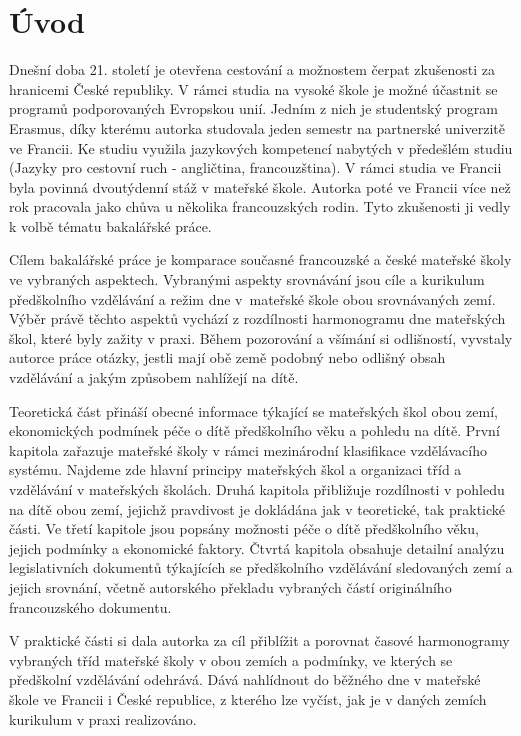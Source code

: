 \setcounter{page}{1}
\chapter*{Úvod}
Dnešní doba 21. století je otevřena cestování a možnostem čerpat zkušenosti za hranicemi České republiky. V rámci studia na vysoké škole je možné účastnit se programů podporovaných Evropskou unií. Jedním z nich je studentský program Erasmus, díky kterému autorka studovala jeden semestr na partnerské univerzitě ve Francii. Ke studiu využila jazykových kompetencí nabytých v předešlém studiu (Jazyky pro cestovní ruch - angličtina, francouzština). V rámci studia ve Francii byla povinná dvoutýdenní stáž v mateřské škole. Autorka poté ve Francii více než rok pracovala jako chůva u několika francouzských rodin. Tyto zkušenosti ji vedly k volbě tématu bakalářské práce. 

Cílem bakalářské práce je komparace současné francouzské a české mateřské školy ve vybraných aspektech. Vybranými aspekty srovnávání jsou cíle a kurikulum předškolního vzdělávání a režim dne v mateřské škole obou srovnávaných zemí. Výběr právě těchto aspektů vychází z rozdílnosti harmonogramu dne mateřských škol, které byly zažity v praxi. Během pozorování a všímání si odlišností, vyvstaly autorce práce otázky, jestli mají obě země podobný nebo odlišný obsah vzdělávání a jakým způsobem nahlížejí na dítě. 

Teoretická část přináší obecné informace týkající se mateřských škol obou zemí, ekonomických podmínek péče o dítě předškolního věku a pohledu na dítě. První kapitola zařazuje mateřské školy v rámci mezinárodní klasifikace vzdělávacího systému. Najdeme zde hlavní principy mateřských škol a organizaci tříd a vzdělávání v mateřských školách. Druhá kapitola přibližuje rozdílnosti v pohledu na dítě obou zemí, jejichž pravdivost je dokládána jak v teoretické, tak praktické části. Ve třetí kapitole jsou popsány možnosti péče o dítě předškolního věku, jejich podmínky a ekonomické faktory. Čtvrtá kapitola obsahuje detailní analýzu legislativních dokumentů týkajících se předškolního vzdělávání sledovaných zemí a jejich srovnání, včetně autorského překladu vybraných částí originálního francouzského dokumentu.

V praktické části si dala autorka za cíl přiblížit a porovnat časové harmonogramy vybraných tříd mateřské školy v obou zemích a podmínky, ve kterých se předškolní vzdělávání odehrává. Dává nahlídnout do běžného dne v mateřské škole ve Francii i České republice, z kterého lze vyčíst, jak je v daných zemích kurikulum v praxi realizováno.  